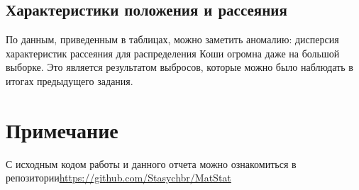 \documentclass[a4paper,12pt]{article} %
\begin{document}
\subsection{Характеристики положения и рассеяния}
По данным, приведенным в таблицах, можно заметить аномалию: дисперсия характеристик рассеяния для распределения Коши огромна даже на большой выборке. Это является результатом выбросов, которые можно было наблюдать в итогах предыдущего задания.
\section*{Примечание}
С исходным кодом работы и данного отчета можно ознакомиться в репозитории\;\url{https://github.com/Stasychbr/MatStat}
\end{document}
